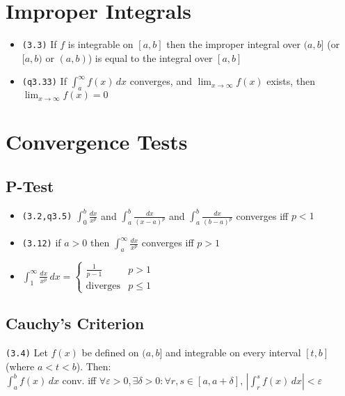 \documentclass[a4paper,landscape]{article}
\newcommand{\tnum}[1]{{\color{gray}\footnotesize\texttt{(#1)}}}
\begin{document}
\begin{multicols}{2}

\section{Improper Integrals}

\begin{itemize}
    \item \tnum{3.3} If $f$ is integrable on $[a,b]$ then the improper integral over $(a,b]$ (or $[a,b)$ or $(a,b)$) is equal to the integral over $[a,b]$
    \item \tnum{q3.33} If $\displaystyle\int_a^{\infty}f(x) \, dx$ converges, and $\displaystyle\lim_{x\to\infty}f(x)$ exists, then $\displaystyle\lim_{x\to\infty}f(x)=0$
\end{itemize}


\setlength{\premulticols}{1pt}
\setlength{\postmulticols}{1pt}
\setlength{\multicolsep}{1pt}
\setlength{\columnsep}{1pt}



\section{Convergence Tests}

\subsection{P-Test}

\begin{itemize}
    \setlength\itemsep{0em}
    \item \tnum{3.2,q3.5} $\displaystyle\int _{0}^b\frac{dx}{x^p}$  and $\displaystyle\int _{a}^b\frac{dx}{(x-a)^p}$ and $\displaystyle\int _{a}^b\frac{dx}{(b-a)^p}$ converges iff $p<1$
    \item \tnum{3.12} if $a>0$ then $\displaystyle\int ^\infty_{a} \frac{dx}{x^p}$ converges iff $p>1$
    \item $\displaystyle\int ^\infty_{1}\frac{dx}{x^{p}} \, dx=\begin{cases} \frac{1}{p-1} &  p>1 \\ \text{diverges} & {p\leq 1}\end{cases}$
\end{itemize}


\subsection{Cauchy's Criterion}
\tnum{3.4} Let $f(x)$ be defined on $(a,b]$ and integrable on every interval $[t,b]$ (where $a<t<b$). Then: \\
 $\displaystyle\int ^b_{a}f(x) \, dx$ conv. iff $\forall\varepsilon>0,\exists \delta>0:\forall r,s\in[a,a+\delta],\,\displaystyle\left|\int ^s_{r}f(x) \, dx\right|<\varepsilon$


\end{multicols}
\end{document}
